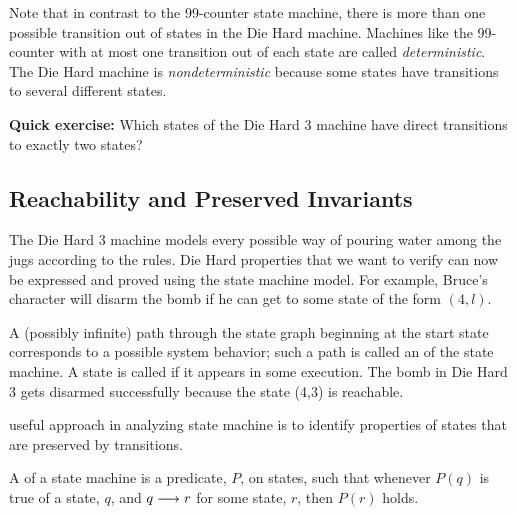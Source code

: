 \begin{example}
Note that in contrast to the 99-counter state machine, there is more than
one possible transition out of states in the Die Hard machine.  Machines
like the 99-counter with at most one transition out of each state are
called \emph{deterministic}.  The Die Hard machine is
\emph{nondeterministic} because some states have transitions to several
different states.

\textbf{Quick exercise:} Which states of the Die Hard 3 machine have
direct transitions to exactly two states?

\end{example}

\subsection{Reachability and Preserved Invariants}

The Die Hard 3 machine models every possible way of pouring water among
the jugs according to the rules.  Die Hard properties that we want to
verify can now be expressed and proved using the state machine model.  For
example, Bruce's character will disarm the bomb if he can get to some
state of the form $(4, l)$.

A (possibly infinite) path through the state graph beginning at the
start state corresponds to a possible system behavior; such a path is
called an  of the state machine.  A state is called
 if it appears in some execution.  The bomb in Die
Hard 3 gets disarmed successfully because the state (4,3) is
reachable.

 useful approach in analyzing state
machine is to identify properties of states that are preserved by
transitions.  

\begin{definition}
  A  of a state machine is a predicate, $P$, on
  states, such that whenever $P(q)$ is true of a state, $q$, and $q
  \mathrel{\longrightarrow} r$ for some state, $r$, then $P(r)$ holds.
\end{definition}


